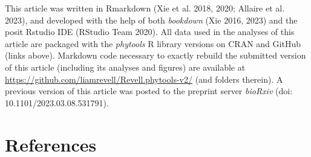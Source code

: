 \documentclass[fleqn,10pt,lineno]{wlpeerj} %
\begin{document}
This article was written in Rmarkdown (Xie et al. 2018, 2020; Allaire et al. 2023), and developed with the help of both \emph{bookdown} (Xie 2016, 2023) and the posit Rstudio IDE (RStudio Team 2020). All data used in the analyses of this article are packaged with the \emph{phytools} R library versions on CRAN and GitHub (links above). Markdown code necessary to exactly rebuild the submitted version of this article (including its analyses and figures) are available at \url{https://github.com/liamrevell/Revell.phytools-v2/} (and folders therein). A previous version of this article was posted to the preprint server \emph{bioRxiv} (doi: 10.1101/2023.03.08.531791).

\hypertarget{references}{%
\section*{References}\label{references}}
\end{document}

